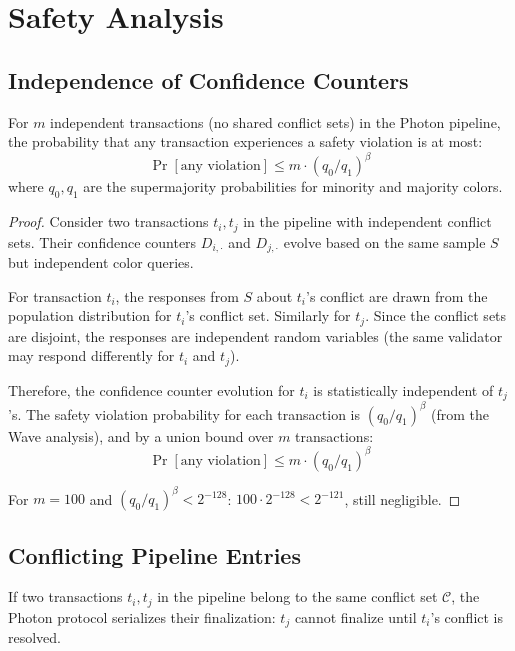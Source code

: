 \section{Safety Analysis}

\label{sec:safety}

\subsection{Independence of Confidence Counters}

\begin{theorem}
\label{thm:pipeline-safety}
For $m$ independent transactions (no shared conflict sets) in the Photon pipeline, the
probability that any transaction experiences a safety violation is at most:
\[
\Pr[\text{any violation}] \leq m \cdot (q_0/q_1)^\beta
\]
where $q_0, q_1$ are the supermajority probabilities for minority and majority colors.
\end{theorem}

\begin{proof}
Consider two transactions $t_i, t_j$ in the pipeline with independent conflict sets.
Their confidence counters $D_{i,\cdot}$ and $D_{j,\cdot}$ evolve based on the same
sample $S$ but independent color queries.

For transaction $t_i$, the responses from $S$ about $t_i$'s conflict are drawn from
the population distribution for $t_i$'s conflict set. Similarly for $t_j$. Since the
conflict sets are disjoint, the responses are independent random variables (the same
validator may respond differently for $t_i$ and $t_j$).

Therefore, the confidence counter evolution for $t_i$ is statistically independent of
$t_j$'s. The safety violation probability for each transaction is $(q_0/q_1)^\beta$
(from the Wave analysis), and by a union bound over $m$ transactions:
\[
\Pr[\text{any violation}] \leq m \cdot (q_0/q_1)^\beta
\]

For $m = 100$ and $(q_0/q_1)^\beta < 2^{-128}$: $100 \cdot 2^{-128} < 2^{-121}$,
still negligible.
\end{proof}

\subsection{Conflicting Pipeline Entries}

\begin{lemma}
\label{lem:serialization}
If two transactions $t_i, t_j$ in the pipeline belong to the same conflict set
$\mathcal{C}$, the Photon protocol serializes their finalization: $t_j$ cannot finalize
until $t_i$'s conflict is resolved.
\end{lemma}

